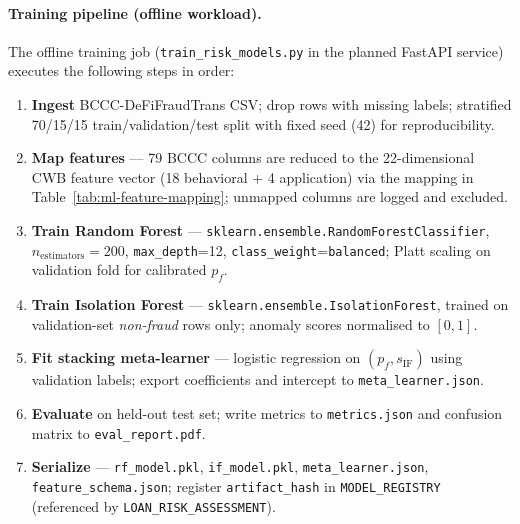 \documentclass[12pt,a4paper]{report}
\begin{document}
\paragraph{Training pipeline (offline workload).}
The offline training job (\texttt{train\_risk\_models.py} in the planned FastAPI service) executes the following steps in order:
\begin{enumerate}[noitemsep]
\item \textbf{Ingest} BCCC-DeFiFraudTrans CSV; drop rows with missing labels; stratified 70/15/15 train/validation/test split with fixed seed (42) for reproducibility.
\item \textbf{Map features} --- 79 BCCC columns are reduced to the 22-dimensional CWB feature vector (18 behavioral + 4 application) via the mapping in Table~\ref{tab:ml-feature-mapping}; unmapped columns are logged and excluded.
\item \textbf{Train Random Forest} --- \texttt{sklearn.ensemble.RandomForestClassifier}, $n_{\text{estimators}}{=}200$, \texttt{max\_depth}{=}12, \texttt{class\_weight}{=}\texttt{balanced}; Platt scaling on validation fold for calibrated $p_f$.
\item \textbf{Train Isolation Forest} --- \texttt{sklearn.ensemble.IsolationForest}, trained on validation-set \textit{non-fraud} rows only; anomaly scores normalised to $[0,1]$.
\item \textbf{Fit stacking meta-learner} --- logistic regression on $(p_f, s_{\text{IF}})$ using validation labels; export coefficients and intercept to \texttt{meta\_learner.json}.
\item \textbf{Evaluate} on held-out test set; write metrics to \texttt{metrics.json} and confusion matrix to \texttt{eval\_report.pdf}.
\item \textbf{Serialize} --- \texttt{rf\_model.pkl}, \texttt{if\_model.pkl}, \texttt{meta\_learner.json}, \texttt{feature\_schema.json}; register \texttt{artifact\_hash} in \texttt{MODEL\_REGISTRY} (referenced by \texttt{LOAN\_RISK\_ASSESSMENT}).
\end{enumerate}
\end{document}
